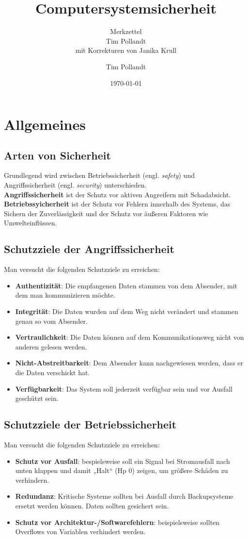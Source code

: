 \documentclass[a4paper, 11pt, accentcolor = tud3b]{tudreport}
\title{Computersystemsicherheit}
\subtitle{Merkzettel \\ Tim Pollandt\\\small{mit Korrekturen von Janika Krull}}
\author{Tim Pollandt}
\date{\today}
\begin{document}
    \maketitle
    \tableofcontents
    

	\chapter{Allgemeines}
			\section{Arten von Sicherheit}
				Grundlegend wird zwischen Betriebssicherheit (engl. \textit{safety}) und Angriffssicherheit (engl. \textit{security}) unterschieden.\\
				\textbf{Angriffssicherheit} ist der Schutz vor aktiven Angreifern mit Schadabsicht.\\
				\textbf{Betriebssyicherheit} ist der Schutz vor Fehlern innerhalb des Systems, das Sichern der Zuverlässigkeit und der Schutz vor äußeren Faktoren wie Umwelteinflüssen.
				
			\section{Schutzziele der Angriffssicherheit}
				Man versucht die folgenden Schutzziele zu erreichen:
				\begin{itemize}
					\item \textbf{Authentizität}: Die empfangenen Daten stammen von dem Absender, mit dem man kommunizieren möchte.
					\item \textbf{Integrität}: Die Daten wurden auf dem Weg nicht verändert und stammen genau so vom Absender.
					\item \textbf{Vertraulichkeit}: Die Daten können auf dem Kommunikationsweg nicht von anderen gelesen werden.
					\item \textbf{Nicht-Abstreitbarkeit}: Dem Absender kann nachgewiesen werden, dass er die Daten verschickt hat.
					\item \textbf{Verfügbarkeit}: Das System soll jederzeit verfügbar sein und vor Ausfall geschützt sein.
				\end{itemize}
				
			\section{Schutzziele der Betriebssicherheit}
				Man versucht die folgenden Schutzziele zu erreichen:
				\begin{itemize}
					\item \textbf{Schutz vor Ausfall}: bespielsweise soll ein Signal bei Stromausfall nach unten klappen und damit „Halt“ (Hp 0) zeigen, um größere Schäden zu verhindern.
					\item \textbf{Redundanz}: Kritische Systeme sollten bei Ausfall durch Backupsysteme ersetzt werden können. Daten sollten gesichert sein.
					\item \textbf{Schutz vor Architektur-/Softwarefehlern}: beispielsweise sollten Overflows von Variablen verhindert werden.
				\end{itemize}
				
\end{document}
